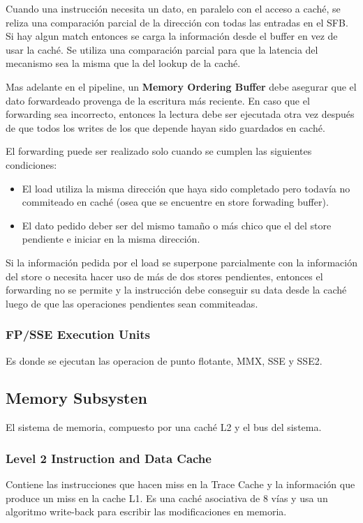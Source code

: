 Cuando una instrucción necesita un dato, en paralelo con el acceso a caché, se reliza una comparación parcial de la dirección con todas las entradas en el SFB. Si hay algun match entonces se carga la información desde el buffer en vez de usar la caché. Se utiliza una comparación parcial para que la latencia del mecanismo sea la misma que la del lookup de la caché.

Mas adelante en el pipeline, un \textbf{Memory Ordering Buffer} debe asegurar que el dato forwardeado provenga de la escritura más reciente. En caso que el forwarding sea incorrecto, entonces la lectura debe ser ejecutada otra vez después de que todos los writes de los que depende hayan sido guardados en caché.

El forwarding puede ser realizado solo cuando se cumplen las siguientes condiciones:
\begin{itemize}
	\item El load utiliza la misma dirección que haya sido completado pero todavía no commiteado en caché (osea que se encuentre en store forwading buffer).
	\item El dato pedido deber ser del mismo tamaño o más chico que el del store pendiente e iniciar en la misma dirección.
\end{itemize}

Si la información pedida por el load se superpone parcialmente con la información del store o necesita hacer uso de más de dos stores pendientes, entonces el forwarding no se permite y  la instrucción debe conseguir su data desde la caché luego de que las operaciones pendientes sean commiteadas.


\subsubsection*{FP/SSE Execution Units}
Es donde se ejecutan las operacion de punto flotante, MMX, SSE y SSE2.
\subsection{Memory Subsysten}
El sistema de memoria, compuesto por una caché L2 y el bus del sistema.

\subsubsection*{Level 2 Instruction and Data Cache}
Contiene las instrucciones que hacen miss en la Trace Cache y la información que produce un miss en la cache L1. Es una caché asociativa de 8 vías y usa un algoritmo write-back para escribir las modificaciones en memoria.

